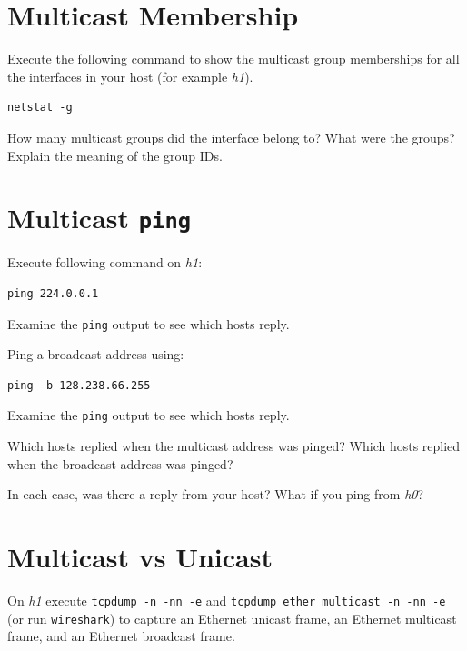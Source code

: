 \documentclass{../UTNetLab}
\begin{document}
\section{Multicast Membership}
    Execute the following command to show the multicast group memberships for all the interfaces in your host (for example \textit{h1}).
    \begin{lstlisting}
netstat -g
    \end{lstlisting}
    
    \begin{report}
    \item How many multicast groups did the interface belong to? What were the groups? Explain the meaning of the group IDs.
    \end{report}

\section{Multicast \texttt{ping}}
    Execute following command on \textit{h1}:
    \begin{lstlisting}
ping 224.0.0.1
    \end{lstlisting}
    Examine the \lstinline{ping} output to see which hosts reply.

    Ping a broadcast address using:
    \begin{lstlisting}
ping -b 128.238.66.255
    \end{lstlisting}
    Examine the \lstinline{ping} output to see which hosts reply.

    
    \begin{report}
    \item Which hosts replied when the multicast address was pinged?
    Which hosts replied when the broadcast address was pinged?

    \item In each case, was there a reply from your host?
    What if you ping from \textit{h0}?
    \end{report}

\section{Multicast vs Unicast\label{sec:multicast-vs-unicast}}
    On \textit{h1} execute \lstinline{tcpdump -n -nn -e} and \lstinline{tcpdump ether multicast -n -nn -e} (or run \lstinline{wireshark}) to capture an Ethernet unicast frame, an Ethernet multicast frame, and an Ethernet broadcast frame.
\end{document}
